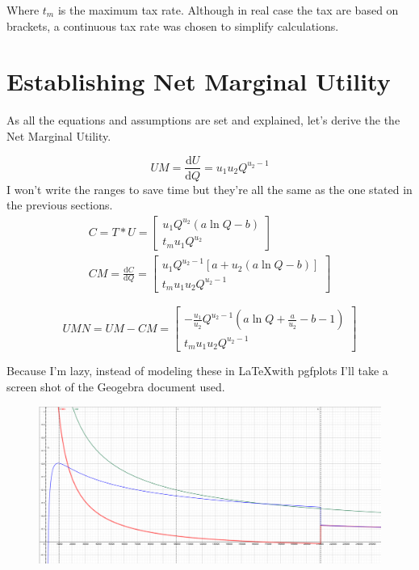 \documentclass[12pt,letterpaper]{article}
\begin{document}
		Where $t_m$ is the maximum tax rate. Although in real case the tax are based on brackets, a continuous tax rate was chosen to simplify calculations.

		\section{Establishing Net Marginal Utility}

			As all the equations and assumptions are set and explained, let's derive the the Net Marginal Utility.

			\begin{equation}
				UM = \frac{\mathrm{d}U}{\mathrm{d}Q} = u_1 u_2 Q^{u_2-1}
			\end{equation}
			I won't write the ranges to save time but they're all the same as the one stated in the previous sections.
			\begin{align}
				C = T*U = \begin{bmatrix}
					u_1 Q^{u_2} (a \ln Q - b) \\
					t_m u_1 Q^{u_2} 
				\end{bmatrix} \\
				CM =\frac{\mathrm{d}C}{\mathrm{d}Q} = \begin{bmatrix}
					u_1 Q^{u_2-1} \left[ a + u_2 (a \ln Q - b) \right] \\
					t_m u_1 u_2 Q^{u_2-1}
				\end{bmatrix}
			\end{align}

			\begin{equation}
				UMN = UM-CM = \begin{bmatrix}
					- \frac{u_1}{u_2} Q^{u_2 - 1} \left( a \ln Q + \frac{a}{u_2} - b - 1 \right) \\
					t_m u_1 u_2 Q^{u_2-1}
				\end{bmatrix}
			\end{equation}

			Because I'm lazy, instead of modeling these in \LaTeX with pgfplots I'll take a screen shot of the Geogebra document used.
		
			\begin{figure}[H]
				\centering
				\includegraphics[width=\textwidth]{graph}
				\label{fig:figure1}
			\end{figure}
\end{document}

